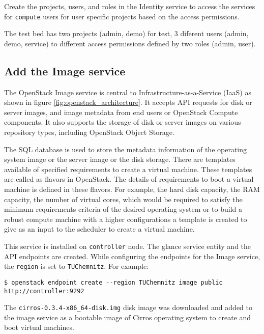 
Create the projects, users, and roles in the Identity service to access the services for \verb|compute| users for user specific projects based on the access permissions.

The test bed has two projects (admin, demo) for test, 3 diferent users (admin, demo, service) to different access permissions defined by two roles (admin, user).

\subsection{Add the Image service}\label{ssec:AddtheImageservice}
The OpenStack Image service is central to Infrastructure-as-a-Service (IaaS) as shown in figure \ref{fig:openstack_architecture}.
It accepts API requests for disk or server images, and image metadata from end users or OpenStack Compute components.
It also supports the storage of disk or server images on various repository types, including OpenStack Object Storage.

The SQL database is used to store the metadata information of the operating system image or the server image or the disk storage.
There are templates available of specified requirements to create a virtual machine.
These templates are called as flavors in OpenStack.
The details of requirements to boot a virtual machine is defined in these flavors.
For example, the hard disk capacity, the RAM capacity, the number of virtual cores, which would be required to satisfy the minimum requirements criteria of the desired operating system or to build a robust compute machine with a higher configurations a template is created to give as an input to the scheduler to create a virtual machine.

This service is installed on \verb|controller| node.
The glance service entity and the API endpoints are created.
While configuring the endpoints for the Image service, the \verb|region| is set to \verb|TUChemnitz|.
For example:
\begin{lstlisting}[frame=single]
$ openstack endpoint create --region TUChemnitz image public http://controller:9292
\end{lstlisting}

The \verb|cirros-0.3.4-x86_64-disk.img| disk image was downloaded and added to the image service as a bootable image of Cirros operating system to create and boot virtual machines.


